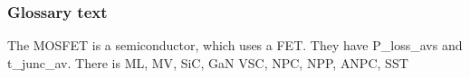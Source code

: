 \begin{frame}
	\frametitle{Glossary text}%
    The \gls{MOSFET} is a semiconductor, which uses a \gls{FET}. They have \glspl{P_loss_av} and \gls{t_junc_av}. There is \gls{ML}, \gls{MV}, \gls{SiC}, \gls{GaN} \gls{VSC}, \gls{NPC}, \gls{NPP}, \gls{ANPC}, \gls{SST}
\end{frame}